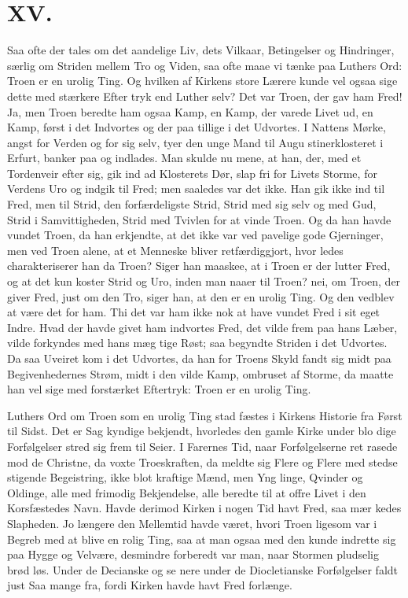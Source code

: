 \documentclass[12pt]{book}
\newcommand{\opage}[1]{\marginnote{\footnotesize\textit{[#1]}}}
\begin{document}
\chapter*{XV.}
\label{ch:xv}
\opage{256}\setcounter{footnote}{0}%
Saa ofte der tales om det aandelige Liv, dets Vilkaar,
Betingelser og Hindringer, særlig om Striden mellem Tro
og Viden, saa ofte maae vi tænke paa Luthers Ord:
Troen er en urolig Ting. Og hvilken af Kirkens store
Lærere kunde vel ogsaa sige dette med stærkere Efter\-%
tryk end Luther selv? Det var Troen, der gav ham Fred!
Ja, men Troen beredte ham ogsaa Kamp, en Kamp, der
varede Livet ud, en Kamp, først i det Indvortes og der\-%
paa tillige i det Udvortes. I Nattens Mørke, angst for
Verden og for sig selv, tyer den unge Mand til Augu\-%
stinerklosteret i Erfurt, banker paa og indlades. Man
skulde nu mene, at han, der, med et Tordenveir efter sig,
gik ind ad Klosterets Dør, slap fri for Livets Storme,
for Verdens Uro og indgik til Fred; men saaledes var
det ikke. Han gik ikke ind til Fred, men til Strid, den
forfærdeligste Strid, Strid med sig selv og med Gud,
Strid i Samvittigheden, Strid med Tvivlen for at vinde
Troen. Og da han havde vundet Troen, da han erkjendte,
at det ikke var ved pavelige gode Gjerninger, men ved
Troen alene, at et Menneske bliver retfærdiggjort, hvor\-%
ledes charakteriserer han da Troen? Siger han maaskee,
at i Troen er der lutter Fred, og at det kun koster Strid
og Uro, inden man naaer til Troen? nei, om Troen, der
\opage{257}\setcounter{footnote}{0}%
giver Fred, just om den Tro, siger han, at den er en
urolig Ting. Og den vedblev at være det for ham. Thi
det var ham ikke nok at have vundet Fred i sit eget
Indre. Hvad der havde givet ham indvortes Fred, det
vilde frem paa hans Læber, vilde forkyndes med hans mæg\-%
tige Røst; saa begyndte Striden i det Udvortes. Da saa
Uveiret kom i det Udvortes, da han for Troens Skyld
fandt sig midt paa Begivenhedernes Strøm, midt i den vilde
Kamp, ombruset af Storme, da maatte han vel sige med
forstærket Eftertryk: Troen er en urolig Ting.

Luthers Ord om Troen som en urolig Ting stad\-%
fæstes i Kirkens Historie fra Først til Sidst. Det er Sag\-%
kyndige bekjendt, hvorledes den gamle Kirke under blo\-%
dige Forfølgelser stred sig frem til Seier. I Farernes Tid,
naar Forfølgelserne ret rasede mod de Christne, da voxte
Troeskraften, da meldte sig Flere og Flere med stedse
stigende Begeistring, ikke blot kraftige Mænd, men Yng\-%
linge, Qvinder og Oldinge, alle med frimodig Bekjendelse,
alle beredte til at offre Livet i den Korsfæstedes Navn.
Havde derimod Kirken i nogen Tid havt Fred, saa mær\-%
kedes Slapheden. Jo længere den Mellemtid havde været,
hvori Troen ligesom var i Begreb med at blive en rolig
Ting, saa at man ogsaa med den kunde indrette sig paa
Hygge og Velvære, desmindre forberedt var man, naar
Stormen pludselig brød løs. Under de Decianske og se\-%
nere under de Diocletianske Forfølgelser faldt just Saa\-%
mange fra, fordi Kirken havde havt Fred forlænge.
\end{document}
